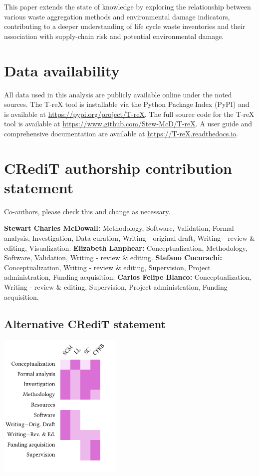 \documentclass[final,5p,authoryear]{elsarticle}
\newcommand{\cbox}[1]{
    \begin{tcolorbox}[hbox, colback=red!5!white, colframe=red!65!black, boxrule=0.25pt, boxsep=2pt, left=2pt, right=2pt, top=1pt, bottom=1pt]
        \small\sffamily #1
    \end{tcolorbox}
}
\begin{document}
This paper extends the state of knowledge by exploring the relationship between various waste aggregation methods and environmental damage indicators, contributing to a deeper understanding of life cycle waste inventories and their association with supply-chain risk and potential environmental damage.


\section*{Data availability} 
All data used in this analysis are publicly available online under the noted sources. The T-reX tool is installable via the Python Package Index (PyPI) and is available at \url{https://pypi.org/project/T-reX}.
The full source code for the T-reX tool is available at \url{https://www.github.com/Stew-McD/T-reX}.
A user guide and comprehensive documentation are available at \url{https://T-reX.readthedocs.io}.

\section*{CRediT authorship contribution statement}
\cbox{Co-authors, please check this and change as necessary.}
\textbf{Stewart Charles McDowall:} Methodology, Software, Validation, Formal analysis, Investigation, Data curation, Writing - original draft, Writing - review \& editing, Visualization.
\textbf{Elizabeth Lanphear:} Conceptualization, Methodology, Software, Validation, Writing - review \& editing.
\textbf{Stefano Cucurachi:} Conceptualization, Writing - review \& editing, Supervision, Project administration, Funding acquisition.
\textbf{Carlos Felipe Blanco:} Conceptualization, Writing - review \& editing, Supervision, Project administration, Funding acquisition.

\subsection*{Alternative CRediT statement}

\includegraphics[width=\columnwidth, height=7cm, keepaspectratio]{credit.pdf}
\end{document}
